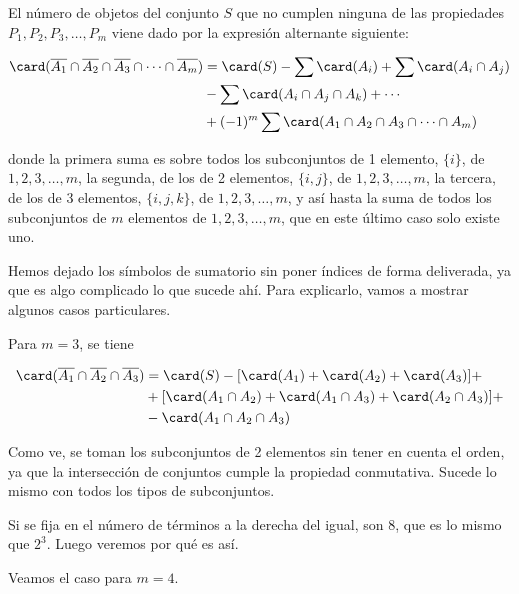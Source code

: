 \begin{theorem}
  El número de objetos del conjunto $S$ que no cumplen ninguna de las
  propiedades $P_1, P_2, P_3, \ldots, P_m$ viene dado por la expresión
  alternante siguiente:

  \begin{alignat*}{2}
    \card(\overline{A_1} \cap \overline{A_2} \cap \overline{A_3} \cap
      \cdots \cap \overline{A_m})
    &= \card(S) - \sum \card(A_i) + \sum \card(A_i \cap A_j) \\
    &- \sum \card(A_i \cap A_j \cap A_k) + \cdots \\
    &+ ({-1})^m \sum \card(A_1 \cap A_2 \cap A_3 \cap \cdots \cap A_m)
  \end{alignat*}

  \noindent donde la primera suma es sobre todos los subconjuntos de 1
  elemento, $\{i\}$, de $1, 2, 3, \ldots, m$, la segunda, de los de 2
  elementos, $\{i, j\}$, de $1, 2, 3, \ldots, m$, la tercera, de los de 3
  elementos, $\{i, j, k\}$, de $1, 2, 3, \ldots, m$, y así hasta la suma de
  todos los subconjuntos de $m$ elementos de $1, 2, 3, \ldots, m$, que en
  este último caso solo existe uno.
\end{theorem}

Hemos dejado los símbolos de sumatorio sin poner índices de forma
deliverada, ya que es algo complicado lo que sucede ahí. Para explicarlo,
vamos a mostrar algunos casos particulares.

Para $m = 3$, se tiene

\begin{alignat*}{2}
  \card(\overline{A_1} \cap \overline{A_2} \cap \overline{A_3})
    &= \card(S) - [\card(A_1) + \card(A_2) + \card(A_3)] + \\
    &+ [\card(A_1 \cap A_2) + \card(A_1 \cap A_3) + \card(A_2 \cap A_3)] + \\
    &- \card(A_1 \cap A_2 \cap A_3)
\end{alignat*}

Como ve, se toman los subconjuntos de 2 elementos sin tener en cuenta el
orden, ya que la intersección de conjuntos cumple la propiedad conmutativa.
Sucede lo mismo con todos los tipos de subconjuntos.

Si se fija en el número de términos a la derecha del igual, son 8, que es lo
mismo que $2^3$. Luego veremos por qué es así.

Veamos el caso para $m = 4$.

